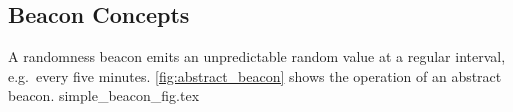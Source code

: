 \begin{comment}
\mtjnote{Rewrite so that we describe a generic use case: Wanting randomness that several people can agree on, but they do not trust each other.}

It is useful to consider what type of users the beacon may be useful to. In general, the beacon can be by any type of multitude that desire to use transparent randomness \mtjnote{wat}.
The best fit for this is trustless applications where parties can be expected to cheat if it would benefit them.

A beacon is not needed for any single party, as they could simply generate their randomness themselves.
It is the need for multiple parties to agree on something random that creates the need for public randomness.

In addition, it is not needed for a setting with trust between the parties, as they could then simply trust each other to generate randomness.
In trust-less settings this is not an option, and so users need randomness they can trust not to be biased, or at least detect if it is.
This is where our beacon finds its niche of applications.
\end{comment}




\subsection{Beacon Concepts}

A randomness beacon emits an unpredictable random value at a regular interval, e.g.\ every five minutes. \cref{fig:abstract_beacon} shows the operation of an abstract beacon.
{simple_beacon_fig.tex}

